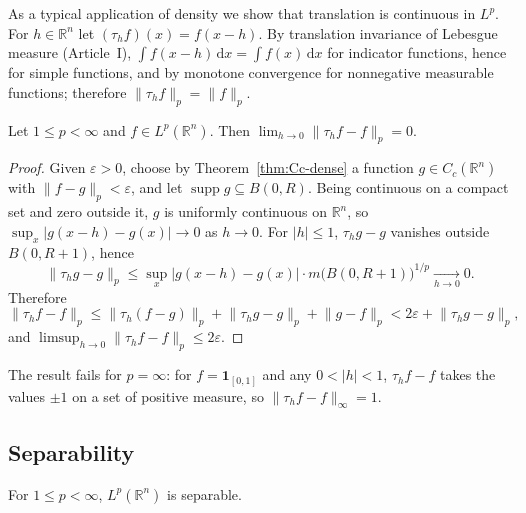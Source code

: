 \documentclass[11pt]{article}
\newcommand{\R}{\mathbb{R}}
\newcommand{\norm}[1]{\lVert #1\rVert}
\newcommand{\dx}{\,\mathrm{d}x}
\newcommand{\ind}{\mathbf{1}}
\DeclareMathOperator{\supp}{supp}
\begin{document}
As a typical application of density we show that translation is continuous in $L^{p}$. For $h\in\R^{n}$ let $(\tau_{h}f)(x)=f(x-h)$. By translation invariance of Lebesgue measure (Article~I), $\int f(x-h)\dx=\int f(x)\dx$ for indicator functions, hence for simple functions, and by monotone convergence for nonnegative measurable functions; therefore $\norm{\tau_{h}f}_{p}=\norm{f}_{p}$.

\begin{theorem}\label{thm:translation}
Let $1\le p<\infty$ and $f\in L^{p}(\R^{n})$. Then $\lim_{h\to0}\norm{\tau_{h}f-f}_{p}=0$.
\end{theorem}

\begin{proof}
Given $\varepsilon>0$, choose by Theorem~\ref{thm:Cc-dense} a function $g\in C_{c}(\R^{n})$ with $\norm{f-g}_{p}<\varepsilon$, and let $\supp g\subseteq B(0,R)$. Being continuous on a compact set and zero outside it, $g$ is uniformly continuous on $\R^{n}$, so $\sup_{x}|g(x-h)-g(x)|\to0$ as $h\to0$. For $|h|\le1$, $\tau_{h}g-g$ vanishes outside $B(0,R+1)$, hence
\[
\norm{\tau_{h}g-g}_{p}\le\sup_{x}|g(x-h)-g(x)|\cdot m\bigl(B(0,R+1)\bigr)^{1/p}\xrightarrow[h\to0]{}0 .
\]
Therefore
\[
\norm{\tau_{h}f-f}_{p}\le\norm{\tau_{h}(f-g)}_{p}+\norm{\tau_{h}g-g}_{p}+\norm{g-f}_{p}<2\varepsilon+\norm{\tau_{h}g-g}_{p},
\]
and $\limsup_{h\to0}\norm{\tau_{h}f-f}_{p}\le2\varepsilon$.
\end{proof}

The result fails for $p=\infty$: for $f=\ind_{[0,1]}$ and any $0<|h|<1$, $\tau_{h}f-f$ takes the values $\pm1$ on a set of positive measure, so $\norm{\tau_{h}f-f}_{\infty}=1$.

\subsection{Separability}

\begin{theorem}\label{thm:separable}
For $1\le p<\infty$, $L^{p}(\R^{n})$ is separable.
\end{theorem}
\end{document}
